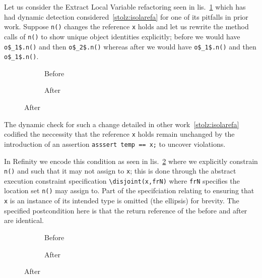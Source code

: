 Let us consider the Extract Local Variable refactoring seen in lis.~\ref{lst:ExtractVariable-java} which has had dynamic detection
considered~\ref{stolz:isolarefa} for one of its pitfalls in prior work. Suppose \lstinline[style=smallJava]|n()| changes the reference
\lstinline[style=smallJava]|x| holds and let us rewrite the method calls of \lstinline[style=smallJava]|n()| to show unique
object identities explicitly; before we would have \lstinline[mathescape=true,style=smallJava]|o$_1$.n()| and then
\lstinline[mathescape=true,style=smallJava]|o$_2$.n()| whereas after we would have \lstinline[mathescape=true,style=smallJava]|o$_1$.n()|
and then \lstinline[mathescape=true,style=smallJava]|o$_1$.n()|.


\begin{figure}[!htb]
  \centering
  \begin{subfigure}{.2\linewidth}
    
    \caption{Before}
  \end{subfigure}\hspace{1cm}
  \begin{subfigure}{.3\linewidth}
    
    \caption{After}
  \end{subfigure}
\label{lst:ExtractVariable-java}
\end{figure}

The dynamic check for such a change detailed in other work~\ref{stolz:isolarefa} codified the neccessity that the reference \lstinline[style=smallJava]|x|
holds remain unchanged by the introduction of an assertion \lstinline[style=smallJava]|asssert temp == x;| to uncover violations.

In Refinity we encode this condition as seen in lis.~\ref{lst:ExtractVariable-refinity} where we explicitly constrain \lstinline[style=refinity]|n()| and
such that it may not assign to \lstinline[style=refinity]|x|; this is done through the abstract execution constraint specification \lstinline[style=refinity]|\disjoint(x,frN)|
where \lstinline[style=refinity]|frN| specifies the location set \lstinline[style=refinity]|n()| may assign to. Part of the specifciation relating to
ensuring that \lstinline[style=refinity]|x| is an instance of its intended type is omitted (the ellipsis) for brevity. The specified postcondition here is that the
return reference of the before and after are identical.

\begin{figure}[!htb]
  \centering
  \begin{subfigure}{.4\linewidth}
    
    \caption{Before}
  \end{subfigure}\hspace{1cm}
  \begin{subfigure}{.4\linewidth}
    
    \caption{After}
  \end{subfigure}
\label{lst:ExtractVariable-refinity}
\end{figure}

